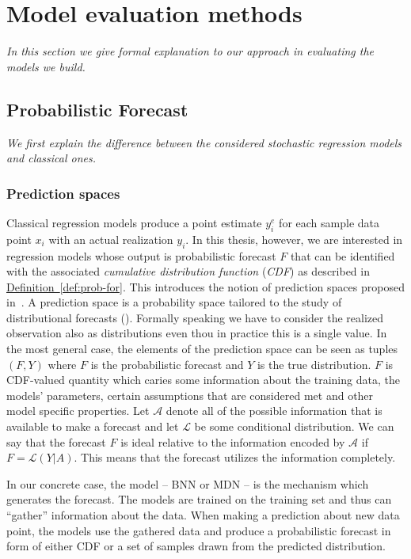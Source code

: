 \documentclass[12pt,a4paper,twoside]{scrartcl}
\numberwithin{equation}{section}
\newcommand{\refdef}[1]{\hyperref[#1]{Definition~\ref*{#1}}}
\begin{document}
\section{Model evaluation methods}\label{sec:criticism}
\noindent\emph{In this section we give formal explanation to our approach in evaluating the models we build.}
\subsection{Probabilistic Forecast}\label{sec:prob-forecast}
\emph{We first explain the difference between the considered stochastic regression models and classical ones.}
\subsubsection{Prediction spaces}\label{sec:pred-space}
Classical regression models produce a point estimate \(y_i^e\) for each sample data point \(x_i\) with an actual realization \(y_i\). In this thesis, however, we are interested in regression models whose output is probabilistic forecast \(F\) that can be identified with the associated \emph{cumulative distribution function} (\emph{CDF}) as described in \refdef{def:prob-for}. This introduces the notion of prediction spaces proposed in~\cite{gneiting2013}. A prediction space is a probability space tailored to the study of distributional forecasts (\cite{gneiting2014}). Formally speaking we have to consider the realized observation also as distributions even thou in practice this is a single value. In the most general case, the elements of the prediction space can be seen as tuples \((F, Y)\) where \(F\) is the probabilistic forecast and \(Y\) is the true distribution. \(F\) is CDF-valued quantity which caries some information about the training data, the models' parameters, certain assumptions that are considered met and other model specific properties. Let \(\mathcal{A}\) denote all of the possible information that is available to make a forecast and let \(\mathcal{L}\) be some conditional distribution. We can say that the forecast \(F\) is ideal relative to the information encoded by \(\mathcal{A}\) if \(F=\mathcal{L}(Y | A)\). This means that the forecast utilizes the information completely. 

In our concrete case, the model -- BNN or MDN -- is the mechanism which generates the forecast. The models are trained on the training set and thus can ``gather'' information about the data. When making a prediction about new data point, the models use the gathered data and produce a probabilistic forecast in form of either CDF or a set of samples drawn from the predicted distribution.
\end{document}
